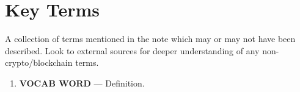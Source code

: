 \documentclass[11pt]{article}
\begin{document}
    
    
    
    
    \newpage
    \thispagestyle{firstpage}
    \vspace*{2\baselineskip}
    \section*{Key Terms}
    \noindent A collection of terms mentioned in the note which may or may not have been described. Look to external sources for deeper understanding of any non-crypto/blockchain terms.
    \begin{enumerate}
        \item \textbf{VOCAB WORD} --- Definition. %
    \end{enumerate}
\end{document}
